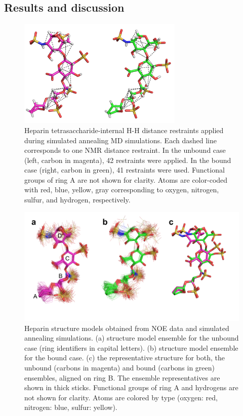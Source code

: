 \subsection{Results and discussion}

\begin{figure}
\centering
\includegraphics[width=0.7\textwidth]{gfx/nmr/two_cases_dashed_lines_distances.png}
\caption[]{
Heparin tetrasaccharide-internal H-H distance restraints applied during
simulated annealing MD simulations. Each dashed line corresponds to one NMR
distance restraint. In the unbound case (left, carbon in magenta), 42
restraints were applied. In the bound case (right, carbon in green), 41
restraints were used. Functional groups of ring A are not shown for clarity.
Atoms are color-coded with red, blue, yellow, gray corresponding to oxygen,
nitrogen, sulfur, and hydrogen, respectively.
}
\label{fig:nmr:hp_dashed_lines_distances}
\end{figure}

\begin{figure}
\centering
\includegraphics[width=\textwidth]{gfx/nmr/Figure_07_bound_vs_free_three_panels_05.png}
\caption[]{
Heparin structure models obtained from NOE data and simulated annealing
simulations. (a) structure model ensemble for the unbound case (ring identifiers
in capital letters). (b) structure model ensemble for the bound case. (c) the
representative structure for both, the unbound (carbons in magenta) and bound
(carbons in green) ensembles, aligned on ring B. The ensemble representatives
are shown in thick sticks. Functional groups of ring A and hydrogens are not
shown for clarity. Atoms are colored by type (oxygen: red, nitrogen: blue,
sulfur: yellow).
}
\label{fig:nmr:hp_ensembles_representatives}
\end{figure}

